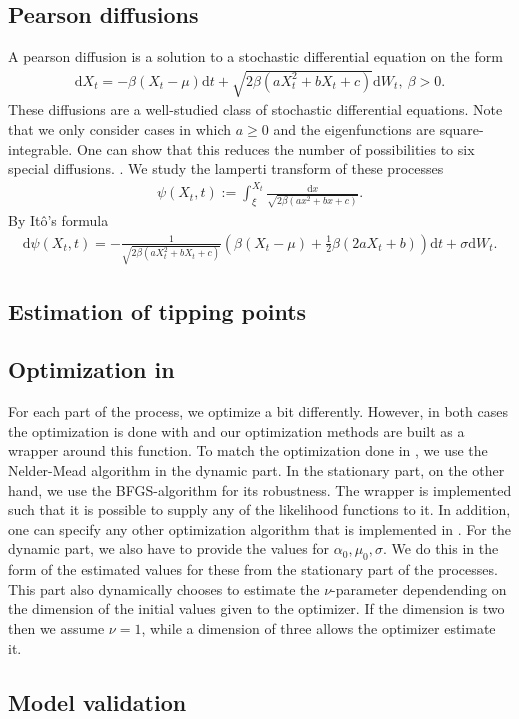\subsection{Pearson diffusions}
A pearson diffusion is a solution to a stochastic differential equation on the form
\begin{align}
    \mathrm{d}X_t = -\beta \left(X_t - \mu\right)\mathrm{d}t + \sqrt{2\beta\left(aX_t^2 + bX_t + c\right)}\mathrm{d}W_t, \: \beta > 0.
\end{align}
These diffusions are a well-studied class of stochastic differential equations. Note that we only consider cases in which $a\geq 0$ and the eigenfunctions are square-integrable. One can show that this reduces the number of possibilities to six special diffusions. \cite[p.36]{StatisticalMethodsForSDE}. We study the lamperti transform of these processes
\begin{align}
    \psi\left(X_t, t\right) := \int_{\xi}^{X_t} \frac{\mathrm{d}x}{\sqrt{2\beta\left(ax^2 + bx + c\right)}}.
\end{align}
By Itô's formula
\begin{align}
    \mathrm{d}\psi\left(X_t, t\right) = - \frac{1}{\sqrt{2\beta\left(aX_t^2 + bX_t + c\right)}}\left(\beta\left(X_t - \mu\right) + \frac{1}{2}\beta\left(2aX_t + b\right)\right)\mathrm{d}t + \sigma \mathrm{d}W_t.
\end{align}
\subsection{Estimation of tipping points}

\subsection{Optimization in }
For each part of the process, we optimize a bit differently. However, in both cases the optimization is done with  \cite{Rlang} and our optimization methods are built as a wrapper around this function. To match the optimization done in \cite{Ditlevsen2023}, we use the Nelder-Mead algorithm in the dynamic part. In the stationary part, on the other hand, we use the BFGS-algorithm for its robustness. The wrapper is implemented such that it is possible to supply any of the likelihood functions to it. In addition, one can specify any other optimization algorithm that is implemented in . For the dynamic part, we also have to provide the values for $\alpha_0, \mu_0, \sigma$. We do this in the form of the estimated values for these from the stationary part of the processes. This part also dynamically chooses to estimate the $\nu$-parameter dependending on the dimension of the initial values given to the optimizer. If the dimension is two then we assume $\nu = 1$, while a dimension of three allows the optimizer estimate it.
\subsection{Model validation}